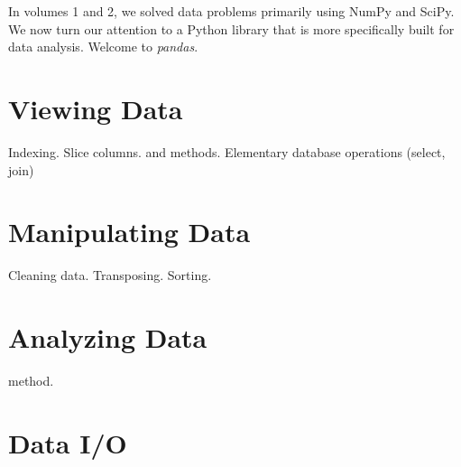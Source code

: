 
In volumes 1 and 2, we solved data problems primarily using NumPy and SciPy.
We now turn our attention to a Python library that is more specifically built for data
analysis. Welcome to \emph{pandas}.

\section*{Viewing Data}
Indexing.
Slice columns.
 and  methods.
Elementary database operations (select, join)

\section*{Manipulating Data}
Cleaning data. Transposing. Sorting.

\section*{Analyzing Data}
 method.

\section*{Data I/O}

